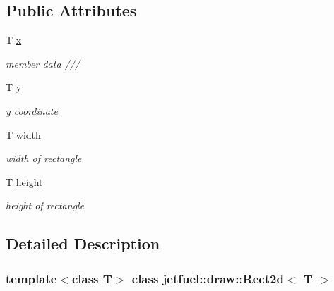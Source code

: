 \subsection*{Public Attributes}
\begin{DoxyCompactItemize}
\item 
T \hyperlink{classjetfuel_1_1draw_1_1Rect2d_ade151e450d1cc5e7b158a28e7bd6d212}{x}
\begin{DoxyCompactList}\small\item\em member data /// \end{DoxyCompactList}\item 
\mbox{\label{classjetfuel_1_1draw_1_1Rect2d_a52d405128b7f28d5427737c3d39cd108}} 
T \hyperlink{classjetfuel_1_1draw_1_1Rect2d_a52d405128b7f28d5427737c3d39cd108}{y}
\begin{DoxyCompactList}\small\item\em y coordinate \end{DoxyCompactList}\item 
\mbox{\label{classjetfuel_1_1draw_1_1Rect2d_aa7e4446e059ed2d85ba66111b1d012f5}} 
T \hyperlink{classjetfuel_1_1draw_1_1Rect2d_aa7e4446e059ed2d85ba66111b1d012f5}{width}
\begin{DoxyCompactList}\small\item\em width of rectangle \end{DoxyCompactList}\item 
\mbox{\label{classjetfuel_1_1draw_1_1Rect2d_afd76834755d8698172922b9d1793f630}} 
T \hyperlink{classjetfuel_1_1draw_1_1Rect2d_afd76834755d8698172922b9d1793f630}{height}
\begin{DoxyCompactList}\small\item\em height of rectangle \end{DoxyCompactList}\end{DoxyCompactItemize}


\subsection{Detailed Description}
\subsubsection*{template$<$class T$>$\newline
class jetfuel\+::draw\+::\+Rect2d$<$ T $>$}


